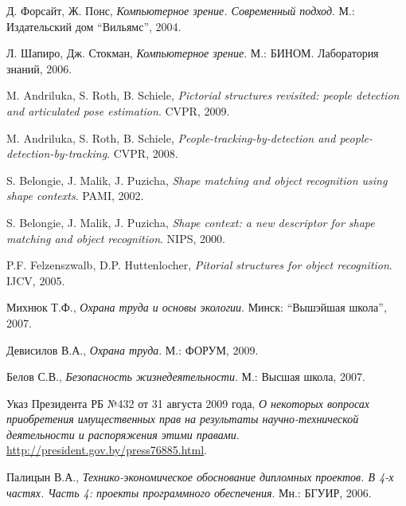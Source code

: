 \begin{thebibliography}{99}

  Д. Форсайт, Ж. Понс,
  \emph{Компьютерное зрение. Современный подход}.
  М.: Издательский дом ``Вильямс'',
  2004.

  Л. Шапиро, Дж. Стокман,
  \emph{Компьютерное зрение}.
  М.: БИНОМ. Лаборатория знаний,
  2006.

  M. Andriluka, S. Roth, B. Schiele,
  \emph{Pictorial structures revisited: people detection and articulated pose estimation}.
  CVPR,
  2009.

  M. Andriluka, S. Roth, B. Schiele,
  \emph{People-tracking-by-detection and people-detection-by-tracking}.
  CVPR,
  2008.

  S. Belongie, J. Malik, J. Puzicha,
  \emph{Shape matching and object recognition using shape contexts}.
  PAMI,
  2002.

  S. Belongie, J. Malik, J. Puzicha,
  \emph{Shape context: a new descriptor for shape matching and object recognition}.
  NIPS,
  2000.

  P.F. Felzenszwalb, D.P. Huttenlocher,
  \emph{Pitorial structures for object recognition}.
  IJCV,
  2005.

  Михнюк Т.Ф.,
  \emph{Охрана труда и основы экологии}.
  Минск: ``Вышэйшая школа'',
  2007.

  Девисилов В.А.,
  \emph{Охрана труда}.
  М.: ФОРУМ,
  2009.

  Белов С.В.,
  \emph{Безопасность жизнедеятельности}.
  М.: Высшая школа,
  2007.

  Указ Президента РБ №432 от 31 августа 2009 года,
  \emph{О некоторых вопросах приобретения имущественных прав на результаты научно-технической деятельности и распоряжения этими правами}.
  \href{http://president.gov.by/press76885.html}{http://president.gov.by/press76885.html}.

  Палицын В.А.,
  \emph{Технико-экономическое обоснование дипломных проектов. В 4-х частях. Часть 4: проекты программного обеспечения}.
  Мн.: БГУИР,
  2006.

\end{thebibliography}
